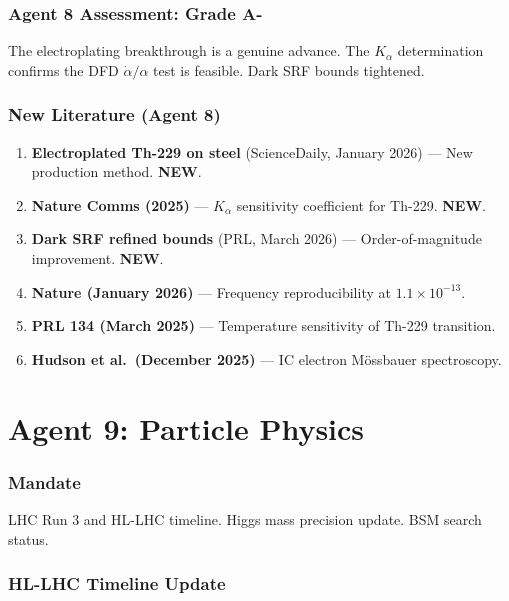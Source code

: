 \documentclass[11pt,a4paper]{article}
\newcommand{\NEW}{\textcolor{dfdblue}{\textbf{NEW}}}
\begin{document}
\section{Agent 8 Assessment: Grade A-}

The electroplating breakthrough is a genuine advance. The $K_\alpha$ determination confirms the DFD $\dot{\alpha}/\alpha$ test is feasible. Dark SRF bounds tightened.

\section{New Literature (Agent 8)}

\begin{enumerate}
\item \textbf{Electroplated Th-229 on steel} (ScienceDaily, January 2026) --- New production method. \NEW.
\item \textbf{Nature Comms (2025)} --- $K_\alpha$ sensitivity coefficient for Th-229. \NEW.
\item \textbf{Dark SRF refined bounds} (PRL, March 2026) --- Order-of-magnitude improvement. \NEW.
\item \textbf{Nature (January 2026)} --- Frequency reproducibility at $1.1 \times 10^{-13}$.
\item \textbf{PRL 134 (March 2025)} --- Temperature sensitivity of Th-229 transition.
\item \textbf{Hudson et al.\ (December 2025)} --- IC electron M\"ossbauer spectroscopy.
\end{enumerate}


\part{Agent 9: Particle Physics}
\label{part:agent9}

\section{Mandate}

LHC Run 3 and HL-LHC timeline. Higgs mass precision update. BSM search status.

\section{HL-LHC Timeline Update}
\end{document}

